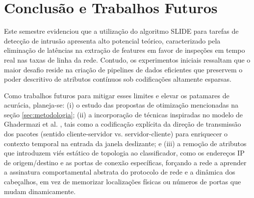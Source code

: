 \documentclass[11pt,a4paper,oneside]{article}
\begin{document}
\section{Conclusão e Trabalhos Futuros}
Este semestre evidenciou que a utilização do algoritmo SLIDE para tarefas de detecção de intrusão apresenta alto potencial teórico, caracterizado pela eliminação de latências na extração de features em favor de inspeções em tempo real nas taxas de linha da rede. Contudo, os experimentos iniciais ressaltam que o maior desafio reside na criação de pipelines de dados eficientes que preservem o poder descritivo de atributos contínuos sob codificações altamente esparsas. 

Como trabalhos futuros para mitigar esses limites e elevar os patamares de acurácia, planeja-se: (i) o estudo das propostas de otimização mencionadas na seção \ref{sec:metodologia}; (ii) a incorporação de técnicas inspiradas no modelo de Ghadermazi et al. \cite{ghadermazi2024towards}, tais como a codificação explícita da direção de transmissão dos pacotes (sentido cliente-servidor vs. servidor-cliente) para enriquecer o contexto temporal na entrada da janela deslizante; e (iii) a remoção de atributos que introduzem viés estático de topologia ao classificador, como os endereços IP de origem/destino e as portas de conexão específicas, forçando a rede a aprender a assinatura comportamental abstrata do protocolo de rede e a dinâmica dos cabeçalhos, em vez de memorizar localizações físicas ou números de portas que mudam dinamicamente.



\end{document}
